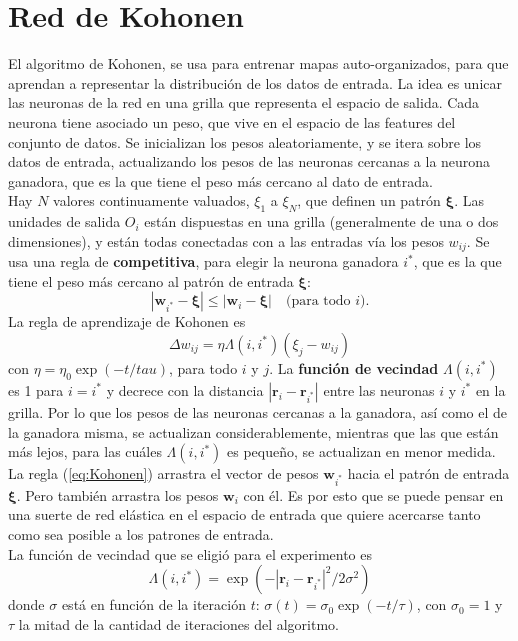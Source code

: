 \documentclass[12pt,a4paper]{article}
\begin{document}
\section{Red de Kohonen}
El algoritmo de Kohonen, se usa para entrenar mapas auto-organizados, para que aprendan a representar la distribución de los datos de entrada. La idea es unicar las neuronas de la red en una grilla que representa el espacio de salida. Cada neurona tiene asociado un peso, que vive en el espacio de las features del conjunto de datos. Se inicializan los pesos aleatoriamente, y se itera sobre los datos de entrada, actualizando los pesos de las neuronas cercanas a la neurona ganadora, que es la que tiene el peso más cercano al dato de entrada.\\
Hay $N$ valores continuamente valuados, $\xi_1$ a $\xi_N$, que definen un patrón $\boldsymbol\xi$. Las unidades de salida $O_i$ están dispuestas en una grilla (generalmente de una o dos dimensiones), y están todas conectadas con a las entradas vía los pesos $w_{ij}$. Se usa una regla de \textbf{competitiva}, para elegir la neurona ganadora $i^*$, que es la que tiene el peso más cercano al patrón de entrada $\boldsymbol\xi$:
$$
|\mathbf w_{i^*} - \boldsymbol\xi| \leq |\mathbf w_i - \boldsymbol\xi| \quad \text{(para todo } i \text{)}.
$$
La regla de aprendizaje de Kohonen es
\[
\Delta w_{ij} = \eta\Lambda (i, i^*) (\xi_j - w_{ij}) \label{eq:Kohonen}\tag{1}
\]
con $\eta = \eta_0 \exp(-t / tau)$, para todo $i$ y $j$. La \textbf{función de vecindad} $\Lambda(i, i^*)$ es 1 para $i = i^*$ y decrece con la distancia $|\mathbf r_i - \mathbf r_{i^*}|$ entre las neuronas $i$ y $i^*$ en la grilla. Por lo que los pesos de las neuronas cercanas a la ganadora, así como el de la ganadora misma, se actualizan considerablemente, mientras que las que están más lejos, para las cuáles $\Lambda(i, i^*)$ es pequeño, se actualizan en menor medida.\\
La regla (\ref{eq:Kohonen}) arrastra el vector de pesos $\mathbf w_{i^*}$ hacia el patrón de entrada $\boldsymbol\xi$. Pero también arrastra los pesos $\mathbf w_i$ con él. Es por esto que se puede pensar en una suerte de red elástica en el espacio de entrada que quiere acercarse tanto como sea posible a los patrones de entrada.\\
La función de vecindad que se eligió para el experimento es
$$
\Lambda(i, i^*) = \exp(-|\mathbf r_i - \mathbf r_{i^*}|^2/2\sigma^2)
$$
donde $\sigma$ está en función de la iteración $t$: $\sigma(t) = \sigma_0 \exp(-t / \tau)$, con $\sigma_0 = 1$ y $\tau$ la mitad de la cantidad de iteraciones del algoritmo.\\
\end{document}

